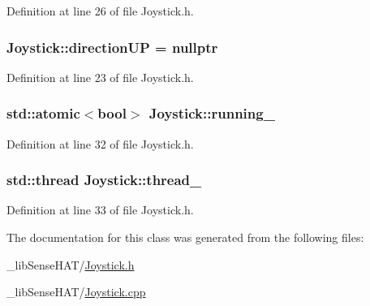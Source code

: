 Definition at line 26 of file Joystick.\+h.

\subsubsection[{\texorpdfstring{direction\+UP}{directionUP}}]{ Joystick\+::direction\+UP = nullptr}\hypertarget{class_joystick_a24b286e28a1e3ada2bc42c4b1ef16339}{}\label{class_joystick_a24b286e28a1e3ada2bc42c4b1ef16339}


Definition at line 23 of file Joystick.\+h.

\subsubsection[{\texorpdfstring{running\+\_\+}{running_}}]{\setlength{\rightskip}{0pt plus 5cm}std\+::atomic$<$bool$>$ Joystick\+::running\+\_\+\hspace{0.3cm}{\ttfamily [protected]}}\hypertarget{class_joystick_a3d79892eee022da43bee5658daeec7bd}{}\label{class_joystick_a3d79892eee022da43bee5658daeec7bd}


Definition at line 32 of file Joystick.\+h.

\subsubsection[{\texorpdfstring{thread\+\_\+}{thread_}}]{\setlength{\rightskip}{0pt plus 5cm}std\+::thread Joystick\+::thread\+\_\+\hspace{0.3cm}{\ttfamily [protected]}}\hypertarget{class_joystick_a885c832d840018ec59c82f081fa18060}{}\label{class_joystick_a885c832d840018ec59c82f081fa18060}


Definition at line 33 of file Joystick.\+h.



The documentation for this class was generated from the following files\+:\begin{DoxyCompactItemize}
\item 
\+\_\+lib\+Sense\+H\+A\+T/\hyperlink{_joystick_8h}{Joystick.\+h}\item 
\+\_\+lib\+Sense\+H\+A\+T/\hyperlink{_joystick_8cpp}{Joystick.\+cpp}\end{DoxyCompactItemize}
